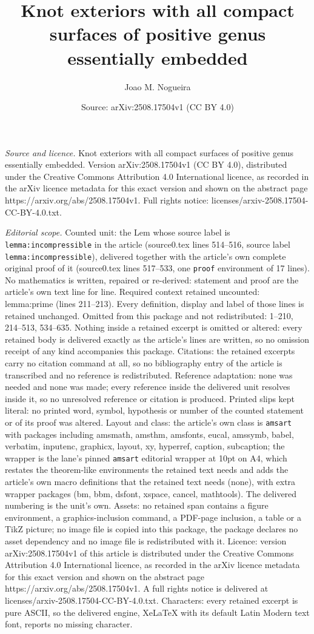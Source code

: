 \documentclass[10pt,a4paper]{amsart}
\title[Knot exteriors with all compact surfaces of positive genus e]{Knot exteriors with all compact surfaces of positive genus essentially embedded}
\author{Joao M. Nogueira}
\date{Source: arXiv:2508.17504v1 (CC BY 4.0)}
\begin{document}
\maketitle

\noindent\emph{Source and licence.} Knot exteriors with all compact surfaces of positive genus essentially embedded. Version arXiv:2508.17504v1 (CC BY 4.0), distributed under the Creative Commons Attribution 4.0 International licence, as recorded in the arXiv licence metadata for this exact version and shown on the abstract page https://arxiv.org/abs/2508.17504v1. Full rights notice: licenses/arxiv-2508.17504-CC-BY-4.0.txt.\par\smallskip

\noindent\textit{Editorial scope.} Counted unit: the Lem whose source label is \texttt{lemma:incompressible} in the article (source0.tex lines 514--516, source label \texttt{lemma:incompressible}), delivered together with the article's own complete original proof of it (source0.tex lines 517--533, one \texttt{proof} environment of 17 lines). No mathematics is written, repaired or re-derived: statement and proof are the article's own text line for line. Required context retained uncounted: lemma:prime (lines 211--213). Every definition, display and label of those lines is retained unchanged. Omitted from this package and not redistributed: 1--210, 214--513, 534--635. Nothing inside a retained excerpt is omitted or altered: every retained body is delivered exactly as the article's lines are written, so no omission receipt of any kind accompanies this package. Citations: the retained excerpts carry no citation command at all, so no bibliography entry of the article is transcribed and no reference is redistributed. Reference adaptation: none was needed and none was made; every reference inside the delivered unit resolves inside it, so no unresolved reference or citation is produced. Printed slips kept literal: no printed word, symbol, hypothesis or number of the counted statement or of its proof was altered. Layout and class: the article's own class is \texttt{amsart} with packages including amsmath, amsthm, amsfonts, eucal, amssymb, babel, verbatim, inputenc, graphicx, layout, xy, hyperref, caption, subcaption; the wrapper is the lane's pinned \texttt{amsart} editorial wrapper at 10pt on A4, which restates the theorem-like environments the retained text needs and adds the article's own macro definitions that the retained text needs (none), with extra wrapper packages (bm, bbm, dsfont, xspace, cancel, mathtools). The delivered numbering is the unit's own. Assets: no retained span contains a figure environment, a graphics-inclusion command, a PDF-page inclusion, a table or a TikZ picture; no image file is copied into this package, the package declares no asset dependency and no image file is redistributed with it. Licence: version arXiv:2508.17504v1 of this article is distributed under the Creative Commons Attribution 4.0 International licence, as recorded in the arXiv licence metadata for this exact version and shown on the abstract page https://arxiv.org/abs/2508.17504v1. A full rights notice is delivered at licenses/arxiv-2508.17504-CC-BY-4.0.txt. Characters: every retained excerpt is pure ASCII, so the delivered engine, XeLaTeX with its default Latin Modern text font, reports no missing character.
\end{document}
